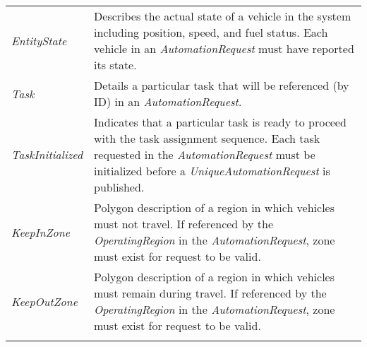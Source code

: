 \begin{longtable}[c]{@{}ll@{}}
\begin{minipage}[t]{0.29\columnwidth}
\emph{EntityState}
\strut\end{minipage} &
\begin{minipage}[t]{0.65\columnwidth}\raggedright\strut
Describes the actual state of a vehicle in the system including
position, speed, and fuel status. Each vehicle in an
\emph{AutomationRequest} must have reported its state.
\strut\end{minipage}\tabularnewline
\begin{minipage}[t]{0.29\columnwidth}\raggedright\strut
\emph{Task}
\strut\end{minipage} &
\begin{minipage}[t]{0.65\columnwidth}\raggedright\strut
Details a particular task that will be referenced (by ID) in an
\emph{AutomationRequest}.
\strut\end{minipage}\tabularnewline
\begin{minipage}[t]{0.29\columnwidth}\raggedright\strut
\emph{TaskInitialized}
\strut\end{minipage} &
\begin{minipage}[t]{0.65\columnwidth}\raggedright\strut
Indicates that a particular task is ready to proceed with the task
assignment sequence. Each task requested in the \emph{AutomationRequest}
must be initialized before a \emph{UniqueAutomationRequest} is
published.
\strut\end{minipage}\tabularnewline
\begin{minipage}[t]{0.29\columnwidth}\raggedright\strut
\emph{KeepInZone}
\strut\end{minipage} &
\begin{minipage}[t]{0.65\columnwidth}\raggedright\strut
Polygon description of a region in which vehicles must not travel. If
referenced by the \emph{OperatingRegion} in the
\emph{AutomationRequest}, zone must exist for request to be valid.
\strut\end{minipage}\tabularnewline
\begin{minipage}[t]{0.29\columnwidth}\raggedright\strut
\emph{KeepOutZone}
\strut\end{minipage} &
\begin{minipage}[t]{0.65\columnwidth}\raggedright\strut
Polygon description of a region in which vehicles must remain during
travel. If referenced by the \emph{OperatingRegion} in the
\emph{AutomationRequest}, zone must exist for request to be valid.
\strut\end{minipage}\tabularnewline
\begin{minipage}[t]{0.29\columnwidth}\raggedright\strut

\end{minipage}
\end{longtable}
